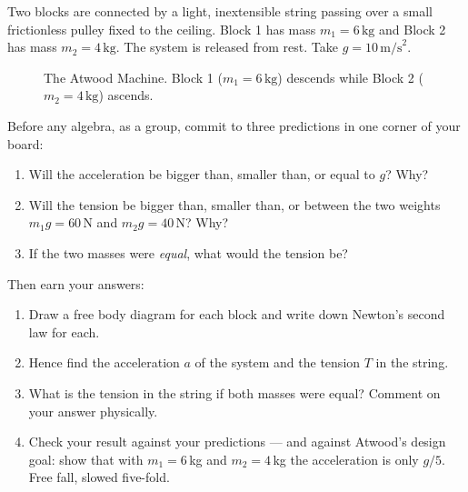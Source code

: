 Two blocks are connected by a light, inextensible string passing over a small frictionless
pulley fixed to the ceiling. Block 1 has mass $m_1=6\,\text{kg}$ and Block 2 has mass
$m_2=4\,\text{kg}$. The system is released from rest. Take $g=10\,\text{m/s}^2$.

\begin{figure}[H]
  \centering
  \caption{The Atwood Machine. Block 1 ($m_1=6\,\text{kg}$) descends while Block 2 ($m_2=4\,\text{kg}$) ascends.}
\end{figure}

\begin{whiteboard}
Before any algebra, as a group, commit to three predictions in one corner of
your board:
\begin{enumerate}[label=(P\arabic*), leftmargin=2.8em, itemsep=1pt]
  \item Will the acceleration be bigger than, smaller than, or equal to $g$? Why?
  \item Will the tension be bigger than, smaller than, or between the two
        weights $m_1g=60$\,N and $m_2g=40$\,N? Why?
  \item If the two masses were \emph{equal}, what would the tension be?
\end{enumerate}
Then earn your answers:
\begin{enumerate}[label=(\alph*), leftmargin=2.5em, itemsep=1pt]
  \item Draw a free body diagram for each block and write down Newton's second law for each.
  \item Hence find the acceleration $a$ of the system and the tension $T$ in the string.
  \item What is the tension in the string if both masses were equal? Comment on your answer physically.
  \item Check your result against your predictions --- and against Atwood's
        design goal: show that with $m_1=6$\,kg and $m_2=4$\,kg the
        acceleration is only $g/5$. Free fall, slowed five-fold.
\end{enumerate}
\end{whiteboard}




